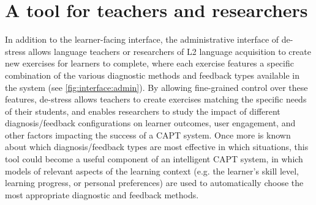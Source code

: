 \documentclass[a4paper]{article}
\newcommand{\TODO}[1]{{\color{red}\textbf{[TODO #1]}}}
\begin{document}
\section{A tool for teachers and researchers}
In addition to the learner-facing interface, 
the administrative interface of de-stress allows
language teachers or researchers of L2 language acquisition 
to
create new exercises for learners to complete, where each exercise features a specific combination of the various diagnostic methods and feedback types available in the system (see \cref{fig:interface:admin}).
By allowing fine-grained control over these features, de-stress allows teachers to create exercises matching the specific needs of their students, and enables researchers to study the 
impact of
different diagnosis/feedback configurations
%
%
%
on learner outcomes, user engagement, and other factors impacting the success of a CAPT system. 
%
Once more is known about which diagnosis/feedback types
are most effective 
in which situations, this tool could become a useful component of an intelligent CAPT system, in which 
models of relevant aspects of the learning context (e.g. the learner's skill level, learning progress, or personal preferences)
are used to automatically choose the most appropriate diagnostic and feedback methods. %
\end{document}
